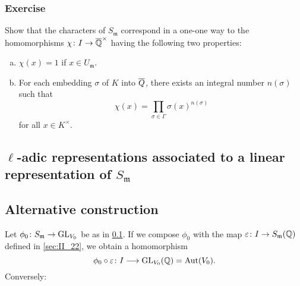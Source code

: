 \subsubsection*{Exercise}
Show that the characters of $S_{\mathfrak{m}}$ correspond in a one-one way to
the homomorphisms $\chi \colon I \to \overline{\mathbb{Q}}^\times$ having the following
two properties:
\begin{enumerate}[(a)]
\item $\chi(x) = 1$ if $x \in U_{\mathfrak{m}}$.
\item For each embedding $\sigma$ of $K$ into $\overline{Q}$, there exists an
	integral number $n(\sigma)$ such that
	\[
		\chi(x) = \prod_{\sigma \in \Gamma} \sigma(x)^{n(\sigma)}
	\]
	for all $x \in K^\times$.
\end{enumerate}

\subsection{\texorpdfstring{$\ell$}{l}-adic representations associated to a
linear representation of \texorpdfstring{$S_{\mathfrak{m}}$}{Sm}}
\label{sec:II_25}

\subsection{Alternative construction}
Let $\phi_0 \colon S_{\mathfrak{m}} \to \operatorname{GL}_{V_0}$ be as in \ref{sec:II_25}. If
we compose $\phi_0$ with the map $\varepsilon \colon I \to
S_{\mathfrak{m}}(\mathbb{Q})$ defined in \ref{sec:II_22}, we obtain a homomorphism
\[
	\phi_0 \circ \varepsilon \colon I \longrightarrow \operatorname{GL}_{V_0}(\mathbb{Q}) =
	\operatorname{Aut}(V_0).
\]
Conversely:
\dpage

